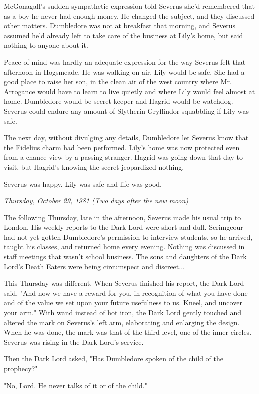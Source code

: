 \documentclass[a4paper,11pt]{article}
\begin{document}
McGonagall's sudden sympathetic expression told Severus she'd remembered that as a boy he never had enough money. He changed the subject, and they discussed other matters. Dumbledore was not at breakfast that morning, and Severus assumed he'd already left to take care of the business at Lily's home, but said nothing to anyone about it.

Peace of mind was hardly an adequate expression for the way Severus felt that afternoon in Hogsmeade. He was walking on air. Lily would be safe. She had a good place to raise her son, in the clean air of the west country where Mr. Arrogance would have to learn to live quietly and where Lily would feel almost at home. Dumbledore would be secret keeper and Hagrid would be watchdog. Severus could endure any amount of Slytherin-Gryffindor squabbling if Lily was safe.

The next day, without divulging any details, Dumbledore let Severus know that the Fidelius charm had been performed. Lily's home was now protected even from a chance view by a passing stranger. Hagrid was going down that day to visit, but Hagrid's knowing the secret jeopardized nothing.

Severus was happy. Lily was safe and life was good.

\emph{Thursday, October 29, 1981 (Two days after the new moon)}

The following Thursday, late in the afternoon, Severus made his usual trip to London. His weekly reports to the Dark Lord were short and dull. Scrimgeour had not yet gotten Dumbledore's permission to interview students, so he arrived, taught his classes, and returned home every evening. Nothing was discussed in staff meetings that wasn't school business. The sons and daughters of the Dark Lord's Death Eaters were being circumspect and discreet...

This Thursday was different. When Severus finished his report, the Dark Lord said, "And now we have a reward for you, in recognition of what you have done and of the value we set upon your future usefulness to us. Kneel, and uncover your arm." With wand instead of hot iron, the Dark Lord gently touched and altered the mark on Severus's left arm, elaborating and enlarging the design. When he was done, the mark was that of the third level, one of the inner circles. Severus was rising in the Dark Lord's service.

Then the Dark Lord asked, "Has Dumbledore spoken of the child of the prophecy?"

"No, Lord. He never talks of it or of the child."
\end{document}

